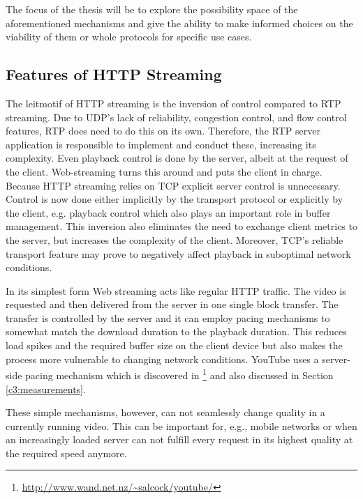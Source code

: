 The focus of the thesis will be to explore the possibility space of the aforementioned mechanisms and give the ability to make informed choices on the viability of them or whole protocols for specific use cases.



\subsection{Features of HTTP Streaming}

The leitmotif of HTTP streaming is the inversion of control compared to RTP streaming. Due to UDP's lack of reliability, congestion control, and flow control features, RTP does need to do this on its own. Therefore, the RTP server application is responsible to implement and conduct these, increasing its complexity. Even playback control is done by the server, albeit at the request of the client. Web-streaming turns this around and puts the client in charge. Because HTTP streaming relies on TCP explicit server control is unnecessary. Control is now done either implicitly by the transport protocol or explicitly by the client, e.g. playback control which also plays an important role in buffer management. This inversion also eliminates the need to exchange client metrics to the server, but increases the complexity of the client. Moreover, TCP's reliable transport feature may prove to negatively affect playback in suboptimal network conditions.



In its simplest form Web streaming acts like regular HTTP traffic. The video is requested and then delivered from the server in one single block transfer. The transfer is controlled by the server and it can employ pacing mechanisms to somewhat match the download duration to the playback duration. This reduces load spikes and the required buffer size on the client device but also makes the process more vulnerable to changing network conditions. YouTube uses a server-side pacing mechanism which is  discovered in \cite{alcock2011afcyt}\footnote{\url{http://www.wand.net.nz/~salcock/youtube/}} and also discussed in Section \ref{c3:measurements}.

These simple mechanisms, however, can not seamlessly change quality in a currently running video. This can be important for, e.g., mobile networks or when an increasingly loaded server can not fulfill every request in its highest quality at the required speed anymore.

